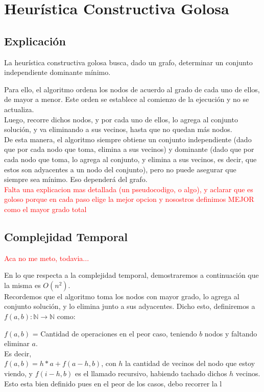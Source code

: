 \section{Heur\'istica Constructiva Golosa} \label{ej3}
\subsection{Explicaci\'on}
La heurística constructiva golosa busca, dado un grafo, determinar un conjunto independiente dominante mínimo. 

Para ello, el algoritmo ordena los nodos de acuerdo al grado de cada uno de ellos, de mayor a menor. Este orden se establece al comienzo de la ejecución y no se actualiza.\\

Luego, recorre dichos nodos, y por cada uno de ellos, lo agrega al conjunto solución, y va eliminando a sus vecinos, hasta que no quedan más nodos.\\

De esta manera, el algoritmo siempre obtiene un conjunto independiente (dado que por cada nodo que toma, elimina a sus vecinos) y dominante (dado que por cada nodo que toma, lo agrega al conjunto, y elimina a sus vecinos, es decir, que estos son adyacentes a un nodo del conjunto), pero no puede asegurar que siempre sea mínimo. Eso dependerá del grafo.\\

\textcolor{red}{Falta una explicacion mas detallada (un pseudocodigo, o algo), y aclarar que es goloso porque en cada paso elige la mejor opcion y nosostros definimos MEJOR como el mayor grado total}

\newpage
\subsection{Complejidad Temporal}
\textcolor{red}{Aca no me meto, todavia...}

En lo que respecta a la complejidad temporal, demostraremos a continuación que la misma es $O(n^{2})$.\\

Recordemos que el algoritmo toma los nodos con mayor grado, lo agrega al conjunto solución, y lo elimina junto a sus adyacentes.
Dicho esto, definiremos a $f(a,b): \mathbb{N} \rightarrow \mathbb{N}$ como:

$f(a,b)$ = Cantidad de operaciones en el peor caso, teniendo $b$ nodos y faltando eliminar $a$.\\
Es decir,\\
$f(a,b) = h*a + f(a-h,b)$, con $h$ la cantidad de vecinos del nodo que estoy viendo, y $f(i-h,b)$ es el llamado recursivo, habiendo tachado dichos $h$ vecinos. Esto esta bien definido pues en el peor de los casos, debo recorrer la l

